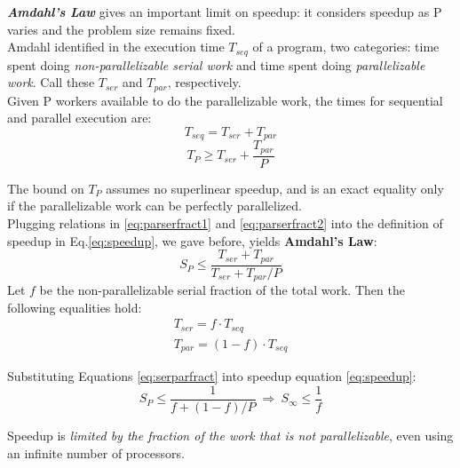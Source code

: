 \textbf{\textit{Amdahl's Law}} gives an important limit on speedup: it considers speedup as P varies and the problem size remains fixed.\\
Amdahl identified in the execution time \(T_{seq}\) of a program, two categories: time spent doing \textit{non-parallelizable serial work} and time spent doing \textit{parallelizable work}. Call these \(T_{ser}\) and \(T_{par}\), respectively. \\
Given P workers available to do the parallelizable work, the times for sequential and parallel execution are:
\begin{equation}\label{eq:parserfract1}
	T_{seq} = T_{ser} + T_{par} 
\end{equation}
\begin{equation}\label{eq:parserfract2}
	T_{P} \geq T_{ser} + \frac{T_{par}}{P}
\end{equation}

The bound on \(T_{P}\) assumes no superlinear speedup, and is an exact equality only if the parallelizable work can be perfectly parallelized.\\
Plugging relations in \ref{eq:parserfract1} and \ref{eq:parserfract2} into the definition of speedup in Eq.\ref{eq:speedup}, we gave before, yields \textbf{Amdahl's Law}:
\begin{equation}
	S_{P} \leq \frac{T_{ser}+T_{par}}{T_{ser}+T_{par}/P}
\end{equation}
Let \(f\) be the non-parallelizable serial fraction of the total work. Then the following equalities hold:
\begin{equation}\label{eq:serparfract}
	\begin{array}{l}
	T_{ser} = f \cdot T_{seq} \\
	 T_{par} = (1-f) \cdot T_{seq}
	 \end{array}
\end{equation}

Substituting Equations \ref{eq:serparfract} into speedup equation \ref{eq:speedup}:
\begin{equation}\label{eq:amdahlupperbound}
	S_{P} \leq \frac{1}{f+(1-f)/P}\  \Rightarrow \  S_{\infty} \leq \frac{1}{f}
\end{equation}

Speedup is \textit{limited by the fraction of the work that is not parallelizable}, even using an infinite number of processors\cite{structparprog,spm}.\\


